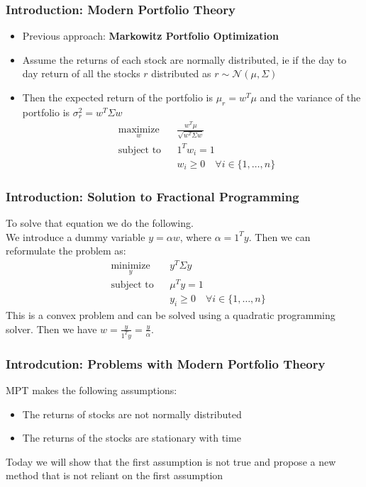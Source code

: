 \documentclass{beamer}
\begin{document}
\begin{frame}
\frametitle{Introduction: Modern Portfolio Theory}
    \begin{itemize}
        \item Previous approach: \textbf{Markowitz Portfolio Optimization}
        \item Assume the returns of each stock are normally distributed, ie if the day to day return of all the stocks $r$ distributed as $r \sim \mathcal{N}(\mu, \Sigma)$
        \item Then the expected return of the portfolio is $\mu_r = w^T\mu$ and the variance of the portfolio is $\sigma_r^2 = w^T\Sigma w$
        \begin{equation}
            \begin{aligned}
                & \underset{w}{\text{maximize}}
                & & \frac{w^T\mu}{\sqrt{w^T\Sigma w}} \\
                & \text{subject to}
                & & 1^Tw_i = 1 \\
                & & & w_i \geq 0 \quad \forall i \in \{1, \dots, n\}
            \end{aligned}
        \end{equation}
    \end{itemize}
\end{frame}
\begin{frame}
\frametitle{Introduction: Solution to Fractional Programming}
    To solve that equation we do the following.\\
    We introduce a dummy variable $y=\alpha w$, where $\alpha=1^T y$. Then we can reformulate the problem as:
    \begin{equation}
        \begin{aligned}
            & \underset{y}{\text{minimize}}
            & & y^T\Sigma y\\
            & \text{subject to}
            & & \mu^Ty = 1 \\
            & & & y_i \geq 0 \quad \forall i \in \{1, \dots, n\}
        \end{aligned}
    \end{equation}
    This is a convex problem and can be solved using a quadratic programming solver. Then we have $w = \frac{y}{1^Ty}= \frac{y}{\alpha}$.
\end{frame}
\begin{frame}
    \frametitle{Introdcution: Problems with Modern Portfolio Theory}
    MPT makes the following assumptions:
    \begin{itemize}
        \item The returns of stocks are not normally distributed
        \item The returns of the stocks are stationary with time
    \end{itemize}
    Today we will show that the first assumption is not true and propose a new method that is not reliant on the first assumption
\end{frame}
\end{document}
